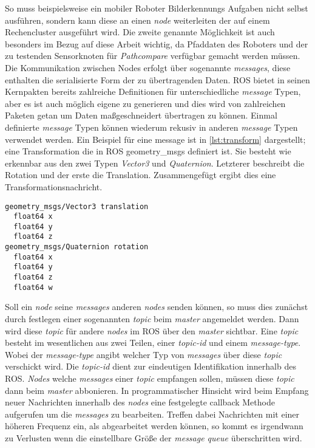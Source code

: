 So muss beispielsweise ein mobiler Roboter Bilderkennungs Aufgaben nicht selbst
ausführen, sondern kann diese an einen \textit{node} weiterleiten der auf einem
Rechencluster ausgeführt wird. Die zweite genannte Möglichkeit ist auch besonders im Bezug auf
diese Arbeit wichtig, da Pfaddaten des Roboters und der zu testenden
Sensorknoten für \textit{Pathcompare} verfügbar gemacht werden müssen.
Die Kommunikation zwischen Nodes erfolgt über sogenannte
\textit{messages}, diese enthalten die serialisierte Form der zu übertragenden Daten.
\gls{ROS} bietet in seinen Kernpakten bereits zahlreiche Definitionen für
unterschiedliche \textit{message} Typen, aber es ist auch
möglich eigene zu generieren und dies wird von
zahlreichen Paketen getan um Daten maßgeschneidert übertragen zu können. Einmal definierte \textit{message} Typen können
wiederum rekusiv in anderen \textit{message} Typen verwendet werden.
Ein Beispiel für eine message ist in \autoref{lst:transform} dargestellt; eine Transformation die in ROS geometry\_msgs
definiert ist. Sie besteht wie erkennbar aus den zwei Typen \textit{Vector3}
und \textit{Quaternion}. Letzterer beschreibt die Rotation und der erste die
Translation. Zusammengefügt ergibt dies eine Transformationsnachricht.

\begin{lstlisting}[caption=ROS transformation message, label=lst:transform]
geometry_msgs/Vector3 translation
  float64 x
  float64 y
  float64 z
geometry_msgs/Quaternion rotation
  float64 x
  float64 y
  float64 z
  float64 w
\end{lstlisting}

Soll ein \textit{node} seine \textit{messages} anderen \textit{nodes} 
senden können, so muss dies zunächst durch festlegen einer sogenannten \textit{topic} beim
\textit{master} angemeldet werden. Dann wird diese \textit{topic} für andere
\textit{nodes} im \gls{ROS} über den \textit{master} sichtbar.
Eine \textit{topic} besteht im wesentlichen aus zwei Teilen, einer
\textit{topic-id} und einem \textit{message-type}. Wobei der
\textit{message-type} angibt welcher Typ von \textit{messages} über diese
\textit{topic} verschickt wird. Die \textit{topic-id} dient zur eindeutigen
Identifikation innerhalb des \gls{ROS}. \textit{Nodes} welche \textit{messages}
einer \textit{topic} empfangen sollen, müssen diese \textit{topic} dann beim
\textit{master} abbonieren. In programmatischer Hinsicht wird beim Empfang
neuer Nachrichten innerhalb des \textit{nodes} eine festgelegte callback
Methode aufgerufen um die \textit{messages} zu bearbeiten. Treffen dabei
Nachrichten mit einer höheren Frequenz ein, als
abgearbeitet werden können, so kommt es irgendwann zu Verlusten wenn die
einstellbare Größe der \textit{message queue} überschritten wird.

